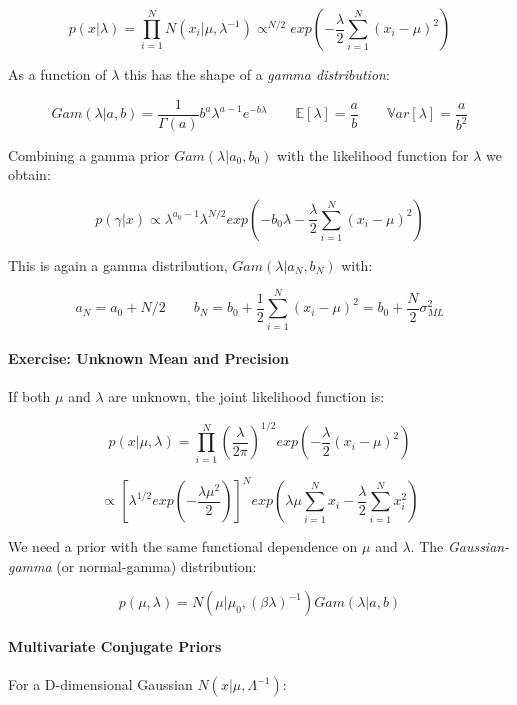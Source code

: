 \documentclass{article}
\begin{document}
\[p(x | \lambda ) = \prod_{i=1}^N N(x_i | \mu, \lambda^{-1}) \propto^{N/2} exp(-\frac{\lambda }{ 2} \sum_{i=1}^N (x_i - \mu)^2)\]

As a function of \(\lambda\) this has the shape of a \emph{gamma
distribution}:

\[Gam(\lambda | a, b) = \frac{1}{\Gamma (a)} b^a \lambda^{a-1} e^{-b\lambda}
\qquad \mathbb{E}[ \lambda ] = \frac{a}{b} \qquad \mathbb{V}ar[\lambda] =
\frac{a}{b^2}\]

Combining a gamma prior \(Gam(\lambda | a_0, b_0)\) with the likelihood
function for \(\lambda\) we obtain:

\[p(\gamma | x) \propto \lambda^{a_0 - 1} \lambda^{N/2} exp (-b_0 \lambda -
\frac{\lambda}{2} \sum_{i=1}^N (x_i - \mu)^2)\]

This is again a gamma distribution, \(Gam(\lambda | a_N, b_N)\) with:

\[a_N = a_0 + N / 2 \qquad b_N = b_0 + \frac{1}{2} \sum_{i=1}^N (x_i - \mu)^2 =
b_0 + \frac{N}{2} \sigma_{ML}^2\]

\paragraph{Exercise: Unknown Mean and
Precision}\label{exercise-unknown-mean-and-precision}

If both \(\mu\) and \(\lambda\) are unknown, the joint likelihood
function is:

\[p(x | \mu, \lambda ) = \prod_{i=1}^N
(\frac{\lambda}{2\pi})^{1/2}exp(-\frac{\lambda}{2}(x_i - \mu)^2)\]

\[\propto [\lambda^{1/2}exp(-\frac{\lambda \mu^2}{2})]^N exp(\lambda \mu
\sum_{i=1}^N x_i - \frac{\lambda}{2}\sum_{i=1}^N x_i^2)\]

We need a prior with the same functional dependence on \(\mu\) and
\(\lambda\). The \emph{Gaussian-gamma} (or normal-gamma) distribution:

\[p(\mu, \lambda) = N(\mu | \mu_0, (\beta \lambda)^{-1})Gam(\lambda | a, b)\]

\paragraph{Multivariate Conjugate
Priors}\label{multivariate-conjugate-priors}

For a D-dimensional Gaussian \(N(x | \mu, \Lambda^{-1})\):
\end{document}

